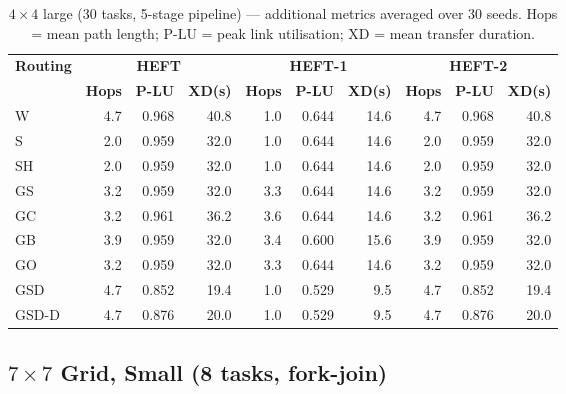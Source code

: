 \documentclass[11pt]{article}
\begin{document}
\begin{table}[H]\centering\small
\begin{tabular}{l r r r r r r r r r}
\toprule
\textbf{Routing} & \multicolumn{3}{c}{\textbf{HEFT}} & \multicolumn{3}{c}{\textbf{HEFT-1}} & \multicolumn{3}{c}{\textbf{HEFT-2}} \\
\cmidrule(lr){2-4}\cmidrule(lr){5-7}\cmidrule(lr){8-10}
& \textbf{Hops} & \textbf{P-LU} & \textbf{XD(s)} & \textbf{Hops} & \textbf{P-LU} & \textbf{XD(s)} & \textbf{Hops} & \textbf{P-LU} & \textbf{XD(s)} \\
\midrule
  W & 4.7 & 0.968 & 40.8 & 1.0 & 0.644 & 14.6 & 4.7 & 0.968 & 40.8 \\
  S & 2.0 & 0.959 & 32.0 & 1.0 & 0.644 & 14.6 & 2.0 & 0.959 & 32.0 \\
  SH & 2.0 & 0.959 & 32.0 & 1.0 & 0.644 & 14.6 & 2.0 & 0.959 & 32.0 \\
  GS & 3.2 & 0.959 & 32.0 & 3.3 & 0.644 & 14.6 & 3.2 & 0.959 & 32.0 \\
  GC & 3.2 & 0.961 & 36.2 & 3.6 & 0.644 & 14.6 & 3.2 & 0.961 & 36.2 \\
  GB & 3.9 & 0.959 & 32.0 & 3.4 & 0.600 & 15.6 & 3.9 & 0.959 & 32.0 \\
  GO & 3.2 & 0.959 & 32.0 & 3.3 & 0.644 & 14.6 & 3.2 & 0.959 & 32.0 \\
  GSD & 4.7 & 0.852 & 19.4 & 1.0 & 0.529 & 9.5 & 4.7 & 0.852 & 19.4 \\
  GSD-D & 4.7 & 0.876 & 20.0 & 1.0 & 0.529 & 9.5 & 4.7 & 0.876 & 20.0 \\
\bottomrule\end{tabular}
\caption{$4\times4$ large (30 tasks, 5-stage pipeline) --- additional metrics averaged over 30 seeds. Hops = mean path length; P-LU = peak link utilisation; XD = mean transfer duration.}
\end{table}

\subsection{$7\times7$ Grid, Small (8 tasks, fork-join)}
\end{document}
